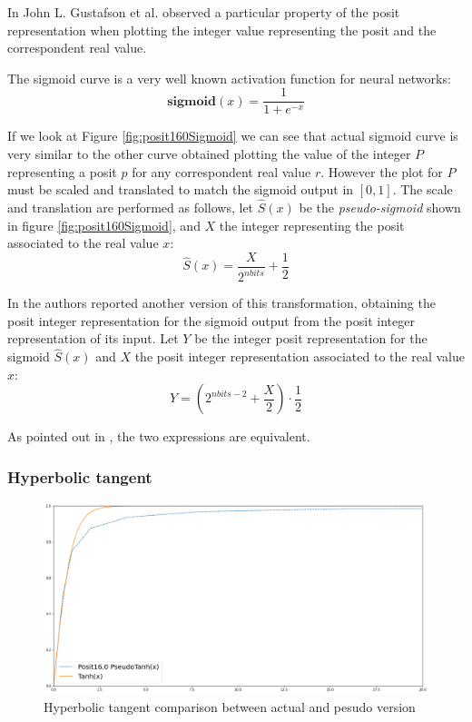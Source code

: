 In \cite{gustafson2017beating} John L. Gustafson et al. observed a particular property of the posit representation when plotting the integer value representing the posit and the correspondent real value.

The sigmoid curve is a very well known activation function for neural networks:
\begin{equation}
    \mathbf{sigmoid}(x) = \frac{1}{1 + e^{-x}}
\end{equation}

If we look at Figure \ref{fig:posit160Sigmoid} we can see that actual sigmoid curve is very similar to the other curve obtained plotting the value of the integer $P$ representing a posit $p$ for any correspondent real value $r$. However the plot for $P$ must be scaled and translated to match the sigmoid output in $[0,1]$. The scale and translation are performed as follows, let $\hat{S}(x)$ be the \textit{pseudo-sigmoid} shown in figure \ref{fig:posit160Sigmoid}, and $X$ the integer representing the posit associated to the real value $x$:
\begin{equation}
    \hat{S}(x) = \frac{X}{2^{nbits}} + \frac{1}{2}
\end{equation}

In \cite{gustafson2017beating} the authors reported another version of this transformation, obtaining the posit integer representation for the sigmoid output from the posit integer representation of its input. Let $Y$ be the integer posit representation for the sigmoid $\hat{S}(x)$ and $X$ the posit integer representation associated to the real value $x$:
\begin{equation}\label{eqn:pseudoSigmoidPosit0}
    Y = \left ( 2^{nbits - 2} + \frac{X}{2} \right ) \cdot \frac{1}{2}
\end{equation}

As pointed out in \cite{coco2020sensors}, the two expressions are equivalent.

\subsubsection{Hyperbolic tangent}

\begin{figure}
    \centering
    \includegraphics[width=\linewidth]{img/tanhPosit160.png}
    \caption{Hyperbolic tangent comparison between actual and pesudo version}
    \label{fig:pseudoTanhPosit0}
\end{figure}

